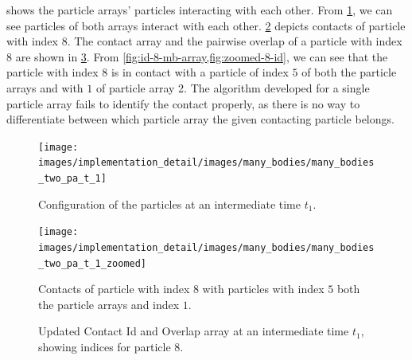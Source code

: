  shows the particle arrays' particles
interacting with each other. From \cref{fig:mb-2-pa-t-2}, we can see particles
of both arrays interact with each other. \cref{fig:zoomed-8-id} depicts
contacts of particle with index $8$. The contact array and the pairwise overlap
of a particle with index $8$ are shown in \cref{fig:id-8-mb-array}. From
\cref{fig:id-8-mb-array,fig:zoomed-8-id}, we can see that the particle with
index $8$ is in contact with a particle of index $5$ of both the particle arrays
and with $1$ of particle array 2. The algorithm developed for a single particle
array fails to identify the contact properly, as there is no way to
differentiate between which particle array the given contacting particle belongs.
\begin{figure}[!htpb]
  \centering
  \texttt{[image: images/implementation\_detail/images/many\_bodies/many\_bodies\_two\_pa\_t\_1]}
  \caption{Configuration of the particles at an intermediate time $t_1$.}
\label{fig:mb-2-pa-t-2}
\end{figure}
\begin{figure}[!htpb]
  \centering
  \texttt{[image: images/implementation\_detail/images/many\_bodies/many\_bodies\_two\_pa\_t\_1\_zoomed]}
  \caption{Contacts of particle with index $8$ with particles with index $5$
    both the particle arrays and index $1$.}
\label{fig:zoomed-8-id}
\end{figure}
\begin{figure}[!htpb]
  \centering
  \caption{Updated Contact Id and Overlap array at an intermediate time $t_1$,
    showing indices for particle $8$.}
\label{fig:id-8-mb-array}
\end{figure}

